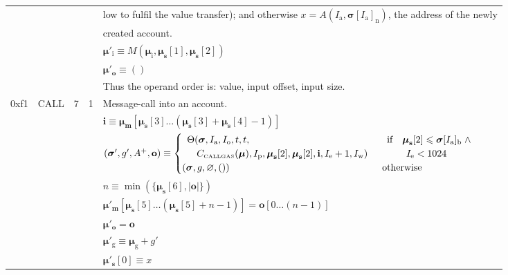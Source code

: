 \documentclass[9pt,oneside]{amsart}
\begin{document}
\begin{tabular*}{\columnwidth}[h]{rlrrl}
&&&& low to fulfil the value transfer); and otherwise $x=A(I_{\mathrm{a}}, \boldsymbol{\sigma}[I_{\mathrm{a}}]_{\mathrm{n}})$, the address of the newly \\
&&&& created account. \\
&&&& $\boldsymbol{\mu}'_{\mathrm{i}} \equiv M(\boldsymbol{\mu}_{\mathrm{i}}, \boldsymbol{\mu}_{\mathbf{s}}[1], \boldsymbol{\mu}_{\mathbf{s}}[2])$ \\
&&&& $\boldsymbol{\mu}'_{\mathbf{o}} \equiv ()$ \\
&&&& Thus the operand order is: value, input offset, input size. \\
\midrule
0xf1 & {\small CALL} & 7 & 1 & Message-call into an account. \\
&&&& $\mathbf{i} \equiv \boldsymbol{\mu}_{\mathbf{m}}[ \boldsymbol{\mu}_{\mathbf{s}}[3] \dots (\boldsymbol{\mu}_{\mathbf{s}}[3] + \boldsymbol{\mu}_{\mathbf{s}}[4] - 1) ]$ \\
&&&& $(\boldsymbol{\sigma}', g', A^+, \mathbf{o}) \equiv \begin{cases}\begin{array}{l}\Theta(\boldsymbol{\sigma}, I_{\mathrm{a}}, I_{\mathrm{o}}, t, t,\\ \quad C_{\text{\tiny CALLGAS}}(\boldsymbol{\mu}), I_{\mathrm{p}}, \boldsymbol{\mu}_{\mathbf{s}}[2], \boldsymbol{\mu}_{\mathbf{s}}[2], \mathbf{i}, I_{\mathrm{e}} + 1, I_{\mathrm{w}})\end{array} & \begin{array}{l}\text{if} \quad \boldsymbol{\mu}_{\mathbf{s}}[2] \leqslant \boldsymbol{\sigma}[I_{\mathrm{a}}]_{\mathrm{b}} \;\wedge \\ \quad\quad I_{\mathrm{e}} < 1024\end{array}\\ (\boldsymbol{\sigma}, g, \varnothing, ()) & \text{otherwise} \end{cases}$ \\
&&&& $n \equiv \min(\{ \boldsymbol{\mu}_{\mathbf{s}}[6], |\mathbf{o}|\})$ \\
&&&& $\boldsymbol{\mu}'_{\mathbf{m}}[ \boldsymbol{\mu}_{\mathbf{s}}[5] \dots (\boldsymbol{\mu}_{\mathbf{s}}[5] + n - 1) ] = \mathbf{o}[0 \dots (n - 1)]$ \\
&&&& $\boldsymbol{\mu}'_{\mathbf{o}} = \mathbf{o}$ \\
&&&& $\boldsymbol{\mu}'_{\mathrm{g}} \equiv \boldsymbol{\mu}_{\mathrm{g}} + g'$ \\
&&&& $\boldsymbol{\mu}'_{\mathbf{s}}[0] \equiv x$ \\

\end{tabular*}
\end{document}
